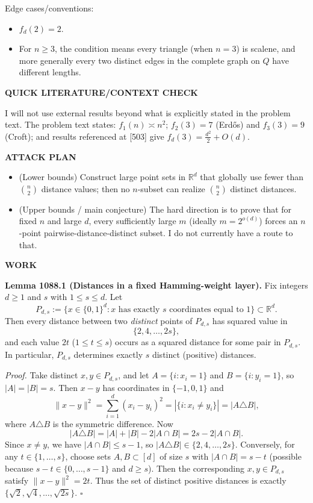 Edge cases/conventions:
\begin{itemize}
\item $f_d(2)=2$.
\item For $n\ge 3$, the condition means every triangle (when $n=3$) is scalene, and more generally every two distinct edges in the complete graph on $Q$ have different lengths.
\end{itemize}

\textbf{QUICK LITERATURE/CONTEXT CHECK}

I will not use external results beyond what is explicitly stated in the problem text.
The problem text states: $f_1(n)\asymp n^2$; $f_2(3)=7$ (Erd\H{o}s) and $f_3(3)=9$ (Croft); and results referenced at [503] give $f_d(3)=\frac{d^2}{2}+O(d)$.

\textbf{ATTACK PLAN}

\begin{itemize}
\item (Lower bounds) Construct large point sets in $\mathbb{R}^d$ that globally use fewer than $\binom{n}{2}$ distance values; then no $n$-subset can realize $\binom{n}{2}$ distinct distances.
\item (Upper bounds / main conjecture) The hard direction is to prove that for fixed $n$ and large $d$, every sufficiently large $m$ (ideally $m=2^{o(d)}$) forces an $n$-point pairwise-distance-distinct subset. I do not currently have a route to that.
\end{itemize}

\textbf{WORK}

\textbf{Lemma 1088.1 (Distances in a fixed Hamming-weight layer).}
Fix integers $d\ge 1$ and $s$ with $1\le s\le d$. Let
\[P_{d,s}:=\{x\in\{0,1\}^d : x \text{ has exactly } s \text{ coordinates equal to }1\}\subset \mathbb{R}^d.
\]
Then every distance between two \emph{distinct} points of $P_{d,s}$ has squared value in
\[\{2,4,\dots,2s\},\]
and each value $2t$ ($1\le t\le s$) occurs as a squared distance for some pair in $P_{d,s}$. In particular, $P_{d,s}$ determines exactly $s$ distinct (positive) distances.

\emph{Proof.}
Take distinct $x,y\in P_{d,s}$, and let $A=\{i: x_i=1\}$ and $B=\{i: y_i=1\}$, so $|A|=|B|=s$.
Then $x-y$ has coordinates in $\{-1,0,1\}$ and
\[\|x-y\|^2=\sum_{i=1}^d (x_i-y_i)^2 = |\{i: x_i\ne y_i\}| = |A\triangle B|,
\]
where $A\triangle B$ is the symmetric difference.
Now
\[|A\triangle B| = |A|+|B|-2|A\cap B| = 2s-2|A\cap B|.
\]
Since $x\neq y$, we have $|A\cap B|\le s-1$, so $|A\triangle B|\in\{2,4,\dots,2s\}$.
Conversely, for any $t\in\{1,\dots,s\}$, choose sets $A,B\subset[d]$ of size $s$ with $|A\cap B|=s-t$ (possible because $s-t\in\{0,\dots,s-1\}$ and $d\ge s$). Then the corresponding $x,y\in P_{d,s}$ satisfy $\|x-y\|^2=2t$.
Thus the set of distinct positive distances is exactly $\{\sqrt{2},\sqrt{4},\dots,\sqrt{2s}\}$.
\hfill$\square$

